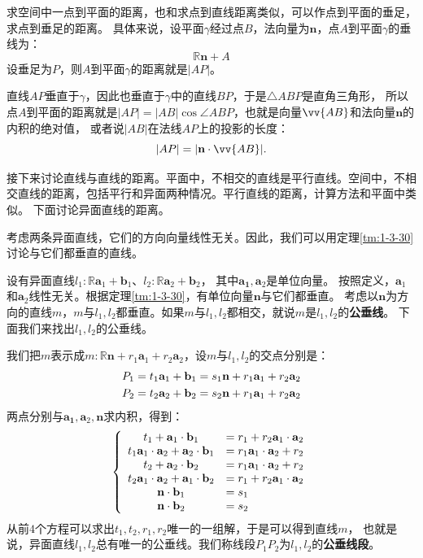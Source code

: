 \documentclass[12pt,UTF8]{ctexbook}
\begin{document}
求空间中一点到平面的距离，也和求点到直线距离类似，可以作点到平面的垂足，求点到垂足的距离。
具体来说，设平面$\gamma$经过点$B$，法向量为$\mathbf{n}$，点$A$到平面$\gamma$的垂线为：
$$ \mathbb{R}\mathbf{n} + A$$
设垂足为$P$，则$A$到平面$\gamma$的距离就是$|AP|$。

直线$AP$垂直于$\gamma$，因此也垂直于$\gamma$中的直线$BP$，于是$\triangle ABP$是直角三角形，
所以点$A$到平面的距离就是$|AP| = |AB|\cos{\angle ABP}$，也就是向量$\vv{AB}$和法向量$\mathbf{n}$的内积的绝对值，
或者说$|AB|$在法线$AP$上的投影的长度：
$$ |AP| = |\mathbf{n}\cdot \vv{AB}|. $$

接下来讨论直线与直线的距离。平面中，不相交的直线是平行直线。空间中，不相交直线的距离，包括平行和异面两种情况。平行直线的距离，计算方法和平面中类似。
下面讨论异面直线的距离。

考虑两条异面直线，它们的方向向量线性无关。因此，我们可以用定理\ref{tm:1-3-30}讨论与它们都垂直的直线。

设有异面直线$l_1:\mathbb{R}\mathbf{a}_1 + \mathbf{b}_1$、$l_2:\mathbb{R}\mathbf{a}_2 + \mathbf{b}_2$，
其中$\mathbf{a_1}, \mathbf{a}_2$是单位向量。
按照定义，$\mathbf{a}_1$和$\mathbf{a}_2$线性无关。根据定理\ref{tm:1-3-30}，有单位向量$\mathbf{n}$与它们都垂直。
考虑以$\mathbf{n}$为方向的直线$m$，$m$与$l_1,l_2$都垂直。如果$m$与$l_1,l_2$都相交，就说$m$是$l_1,l_2$的\textbf{公垂线}。
下面我们来找出$l_1,l_2$的公垂线。

我们把$m$表示成$m: \mathbb{R}\mathbf{n} + r_1\mathbf{a}_1 + r_2\mathbf{a}_2$，设$m$与$l_1,l_2$的交点分别是：
\begin{align}
    P_1 = t_1\mathbf{a}_1 + \mathbf{b}_1 &= s_1\mathbf{n} + r_1\mathbf{a}_1 + r_2\mathbf{a}_2 \notag \\
    P_2 = t_2\mathbf{a}_2 + \mathbf{b}_2 &= s_2\mathbf{n} + r_1\mathbf{a}_1 + r_2\mathbf{a}_2  \notag
\end{align}
两点分别与$\mathbf{a_1}, \mathbf{a}_2,\mathbf{n}$求内积，得到：
$$
\left\{
\begin{array}[]{cl}
    t_1 + \mathbf{a}_1\cdot\mathbf{b}_1 &= r_1 + r_2\mathbf{a}_1\cdot\mathbf{a}_2 \\
    t_1\mathbf{a}_1\cdot\mathbf{a}_2 + \mathbf{a}_2\cdot\mathbf{b}_1 &= r_1\mathbf{a}_1\cdot\mathbf{a}_2 + r_2 \\
    t_2 + \mathbf{a}_2\cdot\mathbf{b}_2 &= r_1\mathbf{a}_1\cdot\mathbf{a}_2 + r_2 \\
    t_2\mathbf{a}_1\cdot\mathbf{a}_2 + \mathbf{a}_1\cdot\mathbf{b}_2 &= r_1 + r_2\mathbf{a}_1\cdot\mathbf{a}_2 \\
    \mathbf{n}\cdot\mathbf{b}_1 &= s_1 \\
    \mathbf{n}\cdot\mathbf{b}_2 &= s_2
\end{array}
\right.
$$
从前$4$个方程可以求出$t_1,t_2,r_1,r_2$唯一的一组解，于是可以得到直线$m$，
也就是说，异面直线$l_1,l_2$总有唯一的公垂线。我们称线段$P_1P_2$为$l_1,l_2$的\textbf{公垂线段}。
\end{document}

